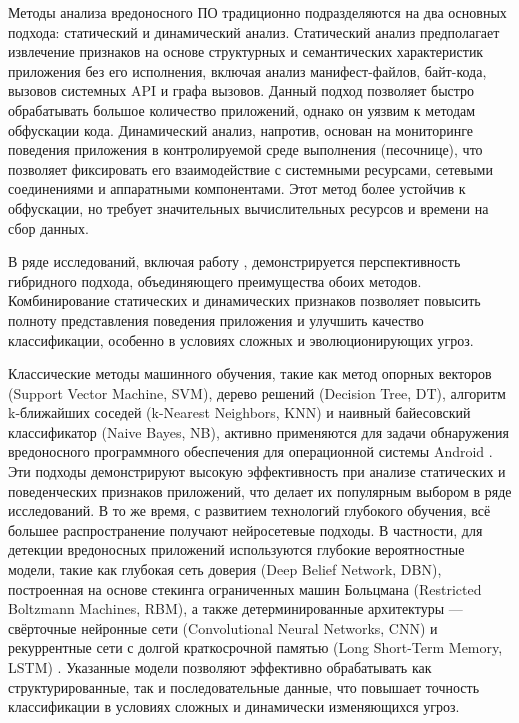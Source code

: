 Методы анализа вредоносного ПО традиционно подразделяются на два основных подхода: статический и динамический анализ. Статический анализ предполагает извлечение признаков на основе структурных и семантических характеристик приложения без его исполнения, включая анализ манифест-файлов, байт-кода, вызовов системных API и графа вызовов. Данный подход позволяет быстро обрабатывать большое количество приложений, однако он уязвим к методам обфускации кода. Динамический анализ, напротив, основан на мониторинге поведения приложения в контролируемой среде выполнения (песочнице), что позволяет фиксировать его взаимодействие с системными ресурсами, сетевыми соединениями и аппаратными компонентами. Этот метод более устойчив к обфускации, но требует значительных вычислительных ресурсов и времени на сбор данных.

В ряде исследований, включая работу \cite{Yuan2014}, демонстрируется перспективность гибридного подхода, объединяющего преимущества обоих методов. Комбинирование статических и динамических признаков позволяет повысить полноту представления поведения приложения и улучшить качество классификации, особенно в условиях сложных и эволюционирующих угроз.


Классические методы машинного обучения, такие как метод опорных векторов (Support Vector Machine, SVM), дерево решений (Decision Tree, DT), алгоритм k-ближайших соседей (k-Nearest Neighbors, KNN) и наивный байесовский классификатор (Naive Bayes, NB), активно применяются для задачи обнаружения вредоносного программного обеспечения для операционной системы Android \cite{Zhang2014, Cai2019}. Эти подходы демонстрируют высокую эффективность при анализе статических и поведенческих признаков приложений, что делает их популярным выбором в ряде исследований. В то же время, с развитием технологий глубокого обучения, всё большее распространение получают нейросетевые подходы. В частности, для детекции вредоносных приложений используются глубокие вероятностные модели, такие как глубокая сеть доверия (Deep Belief Network, DBN), построенная на основе стекинга ограниченных машин Больцмана (Restricted Boltzmann Machines, RBM), а также детерминированные архитектуры — свёрточные нейронные сети (Convolutional Neural Networks, CNN) и рекуррентные сети с долгой краткосрочной памятью (Long Short-Term Memory, LSTM) \cite{Yuan2014, Hou2016, Nix2019}. Указанные модели позволяют эффективно обрабатывать как структурированные, так и последовательные данные, что повышает точность классификации в условиях сложных и динамически изменяющихся угроз.



